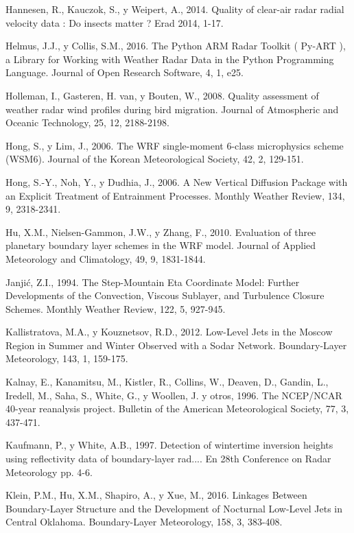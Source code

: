 \documentclass[12pt,spanish,oneside, a4paper]{book}
\begin{document}
\hypertarget{ref-Hannesen2014}{}
Hannesen, R., Kauczok, S., y Weipert, A., 2014. Quality of clear-air
radar radial velocity data : Do insects matter ? Erad 2014, 1-17.

\hypertarget{ref-Helmus2016}{}
Helmus, J.J., y Collis, S.M., 2016. The Python ARM Radar Toolkit (
Py-ART ), a Library for Working with Weather Radar Data in the Python
Programming Language. Journal of Open Research Software, 4, 1, e25.

\hypertarget{ref-Holleman2008}{}
Holleman, I., Gasteren, H. van, y Bouten, W., 2008. Quality assessment
of weather radar wind profiles during bird migration. Journal of
Atmospheric and Oceanic Technology, 25, 12, 2188-2198.

\hypertarget{ref-Hong2006a}{}
Hong, S., y Lim, J., 2006. The WRF single-moment 6-class microphysics
scheme (WSM6). Journal of the Korean Meteorological Society, 42, 2,
129-151.

\hypertarget{ref-Hong2006}{}
Hong, S.-Y., Noh, Y., y Dudhia, J., 2006. A New Vertical Diffusion
Package with an Explicit Treatment of Entrainment Processes. Monthly
Weather Review, 134, 9, 2318-2341.

\hypertarget{ref-Hu2010}{}
Hu, X.M., Nielsen-Gammon, J.W., y Zhang, F., 2010. Evaluation of three
planetary boundary layer schemes in the WRF model. Journal of Applied
Meteorology and Climatology, 49, 9, 1831-1844.

\hypertarget{ref-Janjic1994}{}
Janjić, Z.I., 1994. The Step-Mountain Eta Coordinate Model: Further
Developments of the Convection, Viscous Sublayer, and Turbulence Closure
Schemes. Monthly Weather Review, 122, 5, 927-945.

\hypertarget{ref-Kallistratova2012}{}
Kallistratova, M.A., y Kouznetsov, R.D., 2012. Low-Level Jets in the
Moscow Region in Summer and Winter Observed with a Sodar Network.
Boundary-Layer Meteorology, 143, 1, 159-175.

\hypertarget{ref-Kalnay1996}{}
Kalnay, E., Kanamitsu, M., Kistler, R., Collins, W., Deaven, D., Gandin,
L., Iredell, M., Saha, S., White, G., y Woollen, J. y otros, 1996. The
NCEP/NCAR 40-year reanalysis project. Bulletin of the American
Meteorological Society, 77, 3, 437-471.

\hypertarget{ref-Kaufmann1997}{}
Kaufmann, P., y White, A.B., 1997. Detection of wintertime inversion
heights using reflectivity data of boundary-layer rad.... En 28th
Conference on Radar Meteorology pp. 4-6.

\hypertarget{ref-Klein2016}{}
Klein, P.M., Hu, X.M., Shapiro, A., y Xue, M., 2016. Linkages Between
Boundary-Layer Structure and the Development of Nocturnal Low-Level Jets
in Central Oklahoma. Boundary-Layer Meteorology, 158, 3, 383-408.
\end{document}
